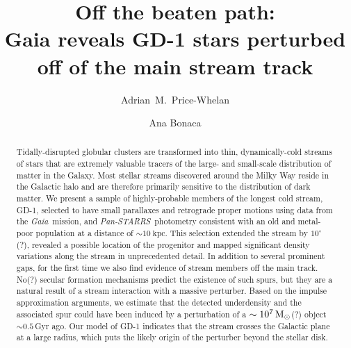 \documentclass[modern]{aastex62}
\newcommand{\gaia}{\textsl{Gaia}}
\newcommand{\pans}{\textsl{Pan-STARRS}}
\newcommand{\kpc}{\textrm{kpc}}
\begin{document}
\sloppy\sloppypar\raggedbottom\frenchspacing %

\title{Off the beaten path: \\
       Gaia reveals GD-1 stars perturbed off of the main stream track}

\author[0000-0003-0872-7098]{Adrian~M.~Price-Whelan}

\author[0000-0002-7846-9787]{Ana Bonaca}

\begin{abstract}\noindent %
Tidally-disrupted globular clusters are transformed into thin, dynamically-cold
streams of stars that are extremely valuable tracers of the large- and
small-scale distribution of matter in the Galaxy.
Most stellar streams discovered around the Milky Way reside in the Galactic halo
and are therefore primarily sensitive to the distribution of dark matter.
We present a sample of highly-probable members of the longest cold stream, GD-1,
selected to have small parallaxes and retrograde proper motions using data from
the \gaia\ mission, and \pans\ photometry consistent with an old and metal-poor
population at a distance of $\sim10~\kpc$.
This selection extended the stream by $10^\circ$(?), revealed a possible location of the progenitor and mapped significant density variations along the stream in unprecedented detail.
In addition to several prominent gaps, for the first time we also find evidence of stream members off the main track.
No(?) secular formation mechanisms predict the existence of such spurs, but they are a natural result of a stream interaction with a massive perturber.
Based on the impulse approximation arguments, we estimate that the detected underdensity and the associated spur could have been induced by a perturbation of a $\sim10^7\,\rm M_\odot$(?) object $\sim 0.5\,$Gyr ago.
Our model of GD-1 indicates that the stream crosses the Galactic plane at a large radius, which puts the likely origin of the perturber beyond the stellar disk.
\end{abstract}

\end{document}
